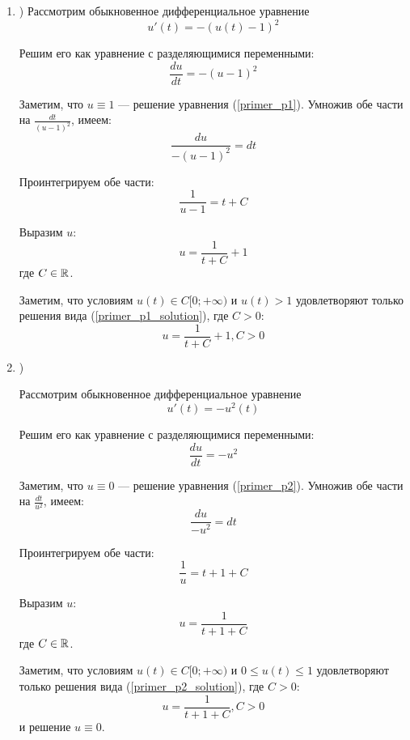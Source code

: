 \begin{enumerate}

\item)
Рассмотрим обыкновенное дифференциальное уравнение
\begin{equation}\label{primer_p1}
	u'(t)=-(u(t)-1)^2
\end{equation}

Решим его как уравнение с разделяющимися переменными:
$$
	\frac{du}{dt}=-(u-1)^2
$$

Заметим, что $u\equiv 1$ --- решение уравнения (\ref{primer_p1}).
Умножив обе части на $\frac{dt}{(u-1)^2}$, имеем:
$$
	\frac{du}{-(u-1)^2}=dt
$$

Проинтегрируем обе части:
$$
	\frac{1}{u-1}=t+C
$$

Выразим $u$:
\begin{equation}\label{primer_p1_solution}
	u=\frac{1}{t+C}+1
\end{equation}
где $C\in\mathbb{R}$.

Заметим, что условиям $u(t) \in C[0; +\infty)$ и $u(t)>1$ удовлетворяют только решения вида (\ref{primer_p1_solution}), где $C>0$:
\begin{equation}
	u=\frac{1}{t+C}+1, C>0
\end{equation}


\item)

Рассмотрим обыкновенное дифференциальное уравнение
\begin{equation}\label{primer_p2}
	u'(t)=-u^2(t)
\end{equation}

Решим его как уравнение с разделяющимися переменными:
$$
	\frac{du}{dt}=-u^2
$$

Заметим, что $u\equiv 0$ --- решение уравнения (\ref{primer_p2}).
Умножив обе части на $\frac{dt}{u^2}$, имеем:
$$
	\frac{du}{-u^2}=dt
$$

Проинтегрируем обе части:
$$
	\frac{1}{u}=t+1+C
$$

Выразим $u$:
\begin{equation}\label{primer_p2_solution}
	u=\frac{1}{t+1+C}
\end{equation}
где $C\in\mathbb{R}$.

Заметим, что условиям $u(t) \in C[0; +\infty)$ и $0 \leq u(t) \leq 1$ удовлетворяют только решения вида (\ref{primer_p2_solution}), где $C>0$:
\begin{equation}
	u=\frac{1}{t+1+C}, C>0
\end{equation}
и решение $u \equiv 0$.





\end{enumerate}
